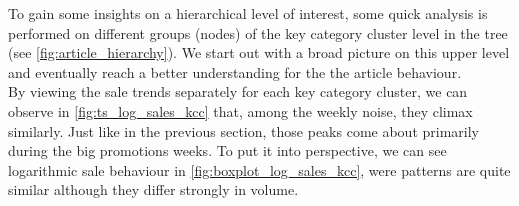 

To gain some insights on a hierarchical level of interest, some quick analysis is performed on different groups (nodes) of the key category cluster level in the tree (see \autoref{fig:article_hierarchy}). We start out with a broad picture on this upper level 
and eventually reach a better understanding for the the article behaviour.
\\



By viewing the sale trends separately for each key category cluster, we can observe in \autoref{fig:ts_log_sales_kcc} that, among the weekly noise, they climax similarly. Just like in the previous section, those peaks come about primarily during the big promotions weeks. To put it into perspective, we can see logarithmic sale behaviour in \autoref{fig:boxplot_log_sales_kcc}, were patterns are quite similar although they differ strongly in volume. 
\\

